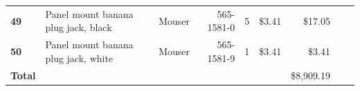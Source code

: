 \begin{table}[!htp]
{\begin{tabular}{llrrrrrrr}
			\textbf{49}    & Panel mount banana plug jack, black                                              & Mouser            & 565-1581-0        & 5  & \$3.41     & \$17.05    \\
			\textbf{50}    & Panel mount banana plug jack, white                                              & Mouser            & 565-1581-9        & 1  & \$3.41     & \$3.41     \\
			\textbf{Total} &                                                                                  &                   &                   &    & \textbf{}  & \$8,909.19 \\      \bottomrule
		\end{tabular}
	}
\end{table}
